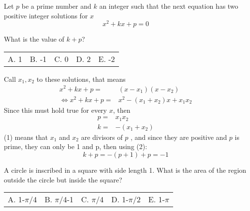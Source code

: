 \documentclass[12pt]{article}
\makeatletter
\newcounter{problem}
\newcommand{\multChoice}[5]{
    \begin{tabular}{l @{\hskip 1.5cm} l @{\hskip 1.5cm} l @{\hskip 1.5cm} l @{\hskip 1.5cm} l}
    A. #1 & B. #2 & C. #3 & D. #4 & E. #5
\end{tabular}

}
\makeatother
\begin{document}
\begin{spacing}{1.3}
\begin{problem}
   Let $p$ be a prime number and $k$ an integer such that the next
    equation has two positive integer solutions for $x$
    $$ x^2 + kx + p = 0 $$

    What is the value of $k + p$? \\ 
\end{problem}
\multChoice{1}{-1}{0}{2}{-2}
\begin{solution}[B]
   Call $x_1,x_2$ to these solutions, that means
    \begin{align*}
    x^2+kx+p=&(x-x_1)(x-x_2) \\
    \iff x^2+kx+p=&x^2-(x_1+x_2)x+x_1x_2
    \end{align*}
    Since this must hold true for every $x$, then 
   \begin{align}
       p=&x_1x_2 \\
       k =& -(x_1+x_2)
   \end{align}
    (1) means that $x_1$ and $x_2$ are divisors of $p$ , and since they are positive
    and $p$ is prime, they can only be 1 and p, then using (2):
    $$k+p = -(p+1) + p = -1$$
\end{solution}


\begin{problem}
   A circle is inscribed in a square with side length 1. What is the
    area of the region outside the circle but inside the square? \\
\end{problem}
\multChoice{1-$\pi$/4}{$\pi$/4-1}{$\pi$/4}{1-$\pi$/2}{1-$\pi$}
\begin{solution}[E]
\end{solution}
\end{spacing}
\end{document}
